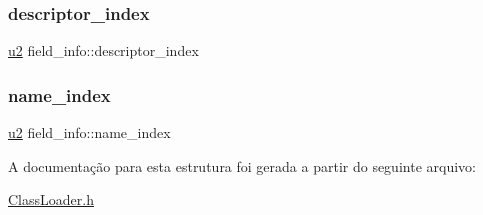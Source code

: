 \subsubsection{\texorpdfstring{descriptor\+\_\+index}{descriptor\_index}}
{\footnotesize\ttfamily \hyperlink{ClassLoader_8h_a5f223212eef04d10a4550ded680cb1cf}{u2} field\+\_\+info\+::descriptor\+\_\+index}

\mbox{\label{structfield__info_a425e3ae85badd81c67ef00acca85ad9e}} 
\subsubsection{\texorpdfstring{name\+\_\+index}{name\_index}}
{\footnotesize\ttfamily \hyperlink{ClassLoader_8h_a5f223212eef04d10a4550ded680cb1cf}{u2} field\+\_\+info\+::name\+\_\+index}



A documentação para esta estrutura foi gerada a partir do seguinte arquivo\+:\begin{DoxyCompactItemize}
\item 
\hyperlink{ClassLoader_8h}{Class\+Loader.\+h}\end{DoxyCompactItemize}
